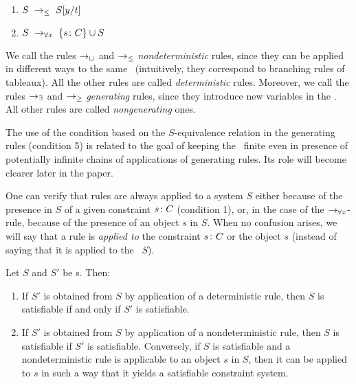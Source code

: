 \begin{enumerate}
\item $S \asps\rtatmost S[y/t]$  \\
                            
\item $S \asps\rtuniv \set{\inc s C} \cup S$  \\
\end{enumerate}


We call the rules $\rightarrow_\sqcup$ and $\rightarrow_\leq$ {\em nondeterministic} rules, since
they can be applied in different ways to the same \cs\ (intuitively, they
correspond to branching rules of tableaux). 
All the other rules are called {\em deterministic} rules.
Moreover, we call the rules $\rightarrow_\exists$ and $\rightarrow_\geq$ {\em generating} rules,
since they introduce new variables in the \cs.
All other rules are called {\em nongenerating} ones. 

The use of the condition based on the $S$-equivalence relation 
in the generating rules (condition 5) is related to the goal of keeping the
\cs\ finite even in presence of potentially infinite chains of applications
of generating rules.
Its role will become clearer later in the paper.

One can verify that 
rules are always applied
to a system $S$ either because of the presence in $S$ of a given 
constraint $s\colon C$ (condition 1), or, in the case of the $\rightarrow_{\forall x}$-rule,
because of the presence of an object $s$ in $S$.
When no confusion arises, we will say that a rule is {\em applied to}
the constraint $s\colon C$ or the object $s$ (instead of saying that it is
applied to the \cs\ $S$).

\begin{proposition}[Invariance]\label{invariance}
Let $S$ and $S'$ be \cs s. Then:

\begin{enumerate}

\item If $S'$ is obtained from $S$ by application of a 
      deterministic rule, 
      then $S$ is satisfiable if and only if $S'$ is satisfiable. 
\item If $S'$ is obtained from $S$ by application of a nondeterministic rule, 
      then $S$ is satisfiable if $S'$ is satisfiable. 
      Conversely, if $S$ is satisfiable and a nondeterministic rule is applicable
      to an object $s$ in $S$, then it can be applied to $s$ in such a way that
      it yields a satisfiable constraint system. 
\end{enumerate}
\end{proposition}

